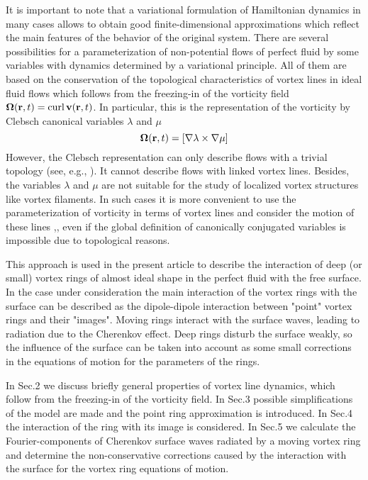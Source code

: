 It is important to note that a variational formulation
of Hamiltonian dynamics  in many cases allows to obtain good finite-dimensional
approximations which reflect the main features of the behavior of the original system.
There are several possibilities
for a parameterization of non-potential flows of perfect fluid by
some variables with dynamics determined by a variational principle.
All of them are based on the conservation of the topological characteristics
of vortex lines in ideal fluid flows which follows from the freezing-in of 
the vorticity field ${\bf \Omega }({\bf r},t)=\mbox{curl}\,{\bf v}({\bf r},t)$.
In particular, this is the representation of the vorticity 
by Clebsch canonical variables $\lambda$ and $\mu$ 
\cite{Lamb} \cite{ZK97}
$$
{\bf \Omega }({\bf r},t)=[\nabla\lambda\times\nabla\mu]
$$
However, the Clebsch representation can only describe flows with 
a trivial topology (see, e.g., \cite{KM80}). 
It cannot describe flows with linked vortex lines. Besides, the variables 
$\lambda$ and $\mu$ are not suitable for the study of localized vortex 
structures like vortex filaments. In such cases it is more convenient to use 
the parameterization of vorticity in terms of vortex lines and
consider the motion of these lines \cite{Berdichevsky},\cite{KR98}, 
even if the global
definition of canonically conjugated variables is impossible due to 
topological reasons.

This approach is used in the present article to describe the interaction
of deep (or small) vortex rings of almost ideal shape 
in the perfect fluid with the free surface. 
In the case under consideration the main interaction of the vortex
rings with the surface can be described as the  dipole-dipole interaction 
between "point" vortex rings and their "images". Moving rings
interact with the surface waves, leading to radiation due to the Cherenkov effect. 
Deep rings disturb the surface weakly, so the influence of the surface
can be taken into account as some small corrections in the equations of motion
for the parameters of the rings.

In Sec.2 we discuss briefly general properties of vortex line dynamics, 
which follow from the freezing-in of the vorticity field.
In Sec.3 possible simplifications of the model are made 
and the point ring approximation is introduced.
In Sec.4 the interaction of the ring with its image is considered.
In Sec.5 we calculate the Fourier-components of Cherenkov surface waves 
radiated by a moving vortex ring 
and determine the non-conservative corrections caused by the 
interaction with the surface for the vortex ring equations of motion.


